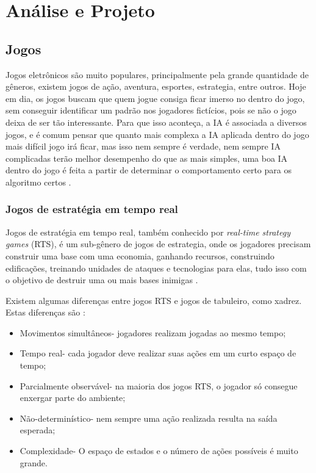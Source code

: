 \chapter{\label{chap:ativ}Análise e Projeto}

\section{Jogos}
 Jogos eletrônicos são muito populares, principalmente pela grande quantidade de gêneros, existem jogos de ação, aventura, esportes, estrategia, entre outros. Hoje em dia, os jogos buscam que quem jogue consiga ficar imerso no dentro do jogo, sem conseguir identificar um padrão nos jogadores fictícios, pois se não o jogo deixa de ser tão interessante. Para que isso aconteça, a IA é associada a diversos jogos, e é comum pensar que quanto mais complexa a IA aplicada dentro do jogo mais difícil jogo irá ficar, mas isso nem sempre é verdade, nem sempre IA complicadas terão melhor desempenho do que as mais simples, uma boa IA dentro do jogo é feita a partir de determinar o comportamento certo para os algoritmo certos \cite{millington2009artificial}.
 
 \subsection{Jogos de estratégia em tempo real}
 
 Jogos de estratégia em tempo real, também conhecido por \textit{real-time strategy games} (RTS), é um sub-gênero de jogos de estrategia, onde os jogadores precisam construir uma base com uma economia, ganhando recursos, construindo edificações, treinando unidades de ataques e tecnologias para elas, tudo isso com o objetivo de destruir uma ou mais bases inimigas \cite{ontanon2013survey, buro2012real}. 
 
 Existem algumas diferenças entre jogos RTS e jogos de tabuleiro, como xadrez. Estas diferenças são \cite{ontanon2013survey}:
 
 \begin{itemize}
 	\item Movimentos simultâneos- jogadores realizam jogadas ao mesmo tempo;
 	\item Tempo real- cada jogador deve realizar suas ações em um curto espaço de tempo;
 	\item Parcialmente observável- na maioria dos jogos RTS, o jogador só consegue enxergar parte do ambiente;
 	\item Não-determinístico- nem sempre uma ação realizada resulta  na saída esperada;
 	\item Complexidade- O espaço de estados e o número de ações possíveis é muito grande.
 \end{itemize} 
 
